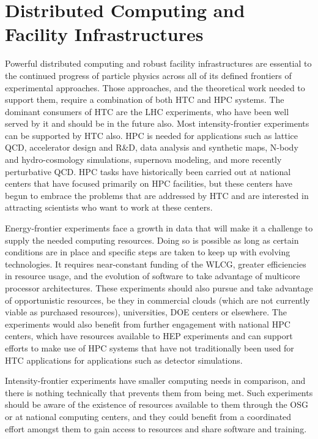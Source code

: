 \section{Distributed Computing and Facility Infrastructures}

Powerful distributed computing and robust facility infrastructures are essential to the continued progress of particle physics across all of its defined frontiers of experimental approaches.  Those approaches, and the theoretical work needed to support them, require a combination of both HTC and HPC systems.  The dominant consumers of HTC are the LHC experiments, who have been well served by it and should be in the future also.  Most intensity-frontier experiments can be supported by HTC also.  HPC is needed for applications such as lattice QCD, accelerator design and R\&D, data analysis and synthetic maps, N-body and hydro-cosmology simulations, supernova modeling, and more recently perturbative QCD.  HPC tasks have historically been carried out at national centers that have focused primarily on HPC facilities, but these centers have begun to embrace the problems that are addressed by HTC and are interested in attracting scientists who want to work at these centers.

Energy-frontier experiments face a growth in data that will make it a challenge to supply the needed computing resources.  Doing so is possible as long as certain conditions are in place and specific steps are taken to keep up with evolving technologies.  It requires near-constant funding of the WLCG, greater efficiencies in resource usage, and the evolution of software to take advantage of multicore processor architectures.  These experiments should also pursue and take advantage of opportunistic resources, be they in commercial clouds (which are not currently viable as purchased resources), universities, DOE centers or elsewhere.  The experiments would also benefit from further engagement with national HPC centers, which have resources available to HEP experiments and can support efforts to make use of HPC systems that have not traditionally been used for HTC applications for applications such as detector simulations.

Intensity-frontier experiments have smaller computing needs in comparison, and there is nothing technically that prevents them from being met.  Such experiments should be aware of the existence of resources available to them through the OSG or at national computing centers, and they could benefit from a coordinated effort amongst them to gain access to resources and share software and training.

